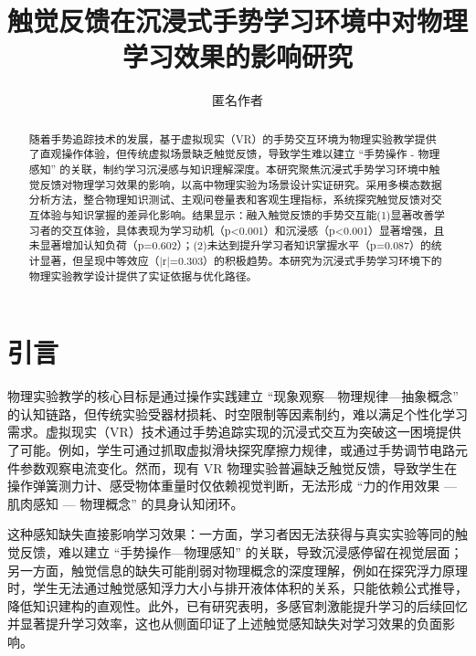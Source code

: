 \documentclass[runningheads]{llncs}
\begin{document}
\title{触觉反馈在沉浸式手势学习环境中对物理学习效果的影响研究}

\author{匿名作者}

\maketitle

\begin{abstract}
  随着手势追踪技术的发展，基于虚拟现实（VR）的手势交互环境为物理实验教学提供了直观操作体验，但传统虚拟场景缺乏触觉反馈，导致学生难以建立 “手势操作 - 物理感知” 的关联，制约学习沉浸感与知识理解深度。本研究聚焦沉浸式手势学习环境中触觉反馈对物理学习效果的影响，以高中物理实验为场景设计实证研究。采用多模态数据分析方法，整合物理知识测试、主观问卷量表和客观生理指标，系统探究触觉反馈对交互体验与知识掌握的差异化影响。结果显示：融入触觉反馈的手势交互能(1)显著改善学习者的交互体验，具体表现为学习动机（p<0.001）和沉浸感（p<0.001）显著增强，且未显著增加认知负荷（p=0.602）；(2)未达到提升学习者知识掌握水平（p=0.087）的统计显著，但呈现中等效应（|r|=0.303）的积极趋势。本研究为沉浸式手势学习环境下的物理实验教学设计提供了实证依据与优化路径。

\end{abstract}
 
\section{引言}
物理实验教学的核心目标是通过操作实践建立 “现象观察—物理规律—抽象概念” 的认知链路\cite{civelek2014effects,bao2019physics,freeman2014active}，但传统实验受器材损耗、时空限制等因素制约，难以满足个性化学习需求\cite{yang2007impact,ma2023investigation}。虚拟现实（VR）技术通过手势追踪实现的沉浸式交互为突破这一困境提供了可能\cite{yang2019gesture}。例如，学生可通过抓取虚拟滑块探究摩擦力规律，或通过手势调节电路元件参数观察电流变化。然而，现有 VR 物理实验普遍缺乏触觉反馈，导致学生在操作弹簧测力计、感受物体重量时仅依赖视觉判断，无法形成 “力的作用效果 — 肌肉感知 — 物理概念” 的具身认知闭环\cite{giri2021application}。

这种感知缺失直接影响学习效果：一方面，学习者因无法获得与真实实验等同的触觉反馈，难以建立 “手势操作—物理感知” 的关联，导致沉浸感停留在视觉层面\cite{app14114935}；另一方面，触觉信息的缺失可能削弱对物理概念的深度理解，例如在探究浮力原理时，学生无法通过触觉感知浮力大小与排开液体体积的关系，只能依赖公式推导，降低知识建构的直观性\cite{neri2024enhancing}。此外，已有研究表明，多感官刺激能提升学习的后续回忆并显著提升学习效率，这也从侧面印证了上述触觉感知缺失对学习效果的负面影响\cite{murray2023crossmodal}。
\end{document}
